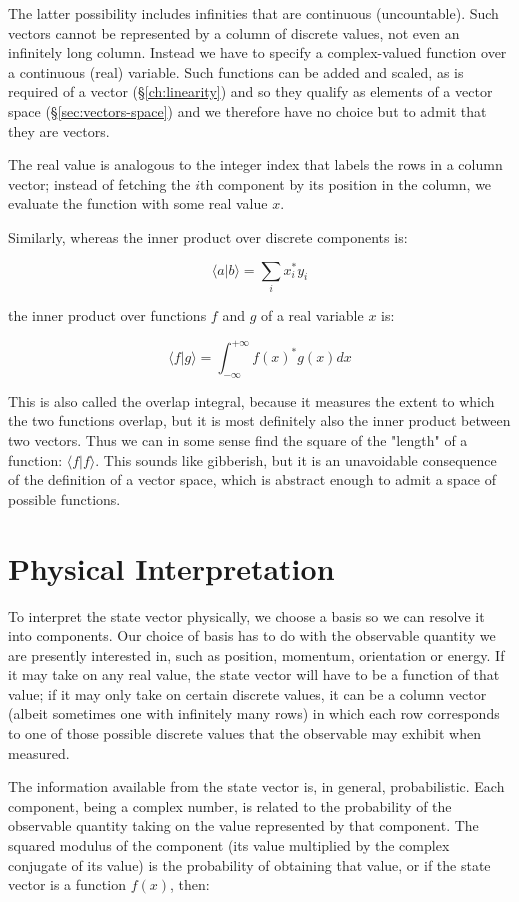 The latter possibility includes infinities that are continuous (uncountable). Such vectors cannot be represented by a column of discrete values, not even an infinitely long column. Instead we have to specify a complex-valued function over a continuous (real) variable. Such functions can be added and scaled, as is required of a vector (§\ref{ch:linearity}) and so they qualify as elements of a vector space (§\ref{sec:vectors-space}) and we therefore have no choice but to admit that they are vectors.

The real value is analogous to the integer index that labels the rows in a column vector; instead of fetching the $i$th component by its position in the column, we evaluate the function with some real value $x$.

Similarly, whereas the inner product over discrete components is:

$$
\langle a | b \rangle
=
\sum_i
x_i^* y_i
$$

the inner product over functions $f$ and $g$ of a real variable $x$ is:

$$
\langle f | g \rangle
=
\int_{-\infty}^{+\infty}
f(x)^* g(x)
dx
$$

This is also called the overlap integral, because it measures the extent to which the two functions overlap, but it is most definitely also the inner product between two vectors. Thus we can in some sense find the square of the "length" of a function: $\langle f | f \rangle$. This sounds like gibberish, but it is an unavoidable consequence of the definition of a vector space, which is abstract enough to admit a space of possible functions.

\section{Physical Interpretation}

To interpret the state vector physically, we choose a basis so we can resolve it into components. Our choice of basis has to do with the observable quantity we are presently interested in, such as position, momentum, orientation or energy. If it may take on any real value, the state vector will have to be a function of that value; if it may only take on certain discrete values, it can be a column vector (albeit sometimes one with infinitely many rows) in which each row corresponds to one of those possible discrete values that the observable may exhibit when measured.

The information available from the state vector is, in general, probabilistic. Each component, being a complex number, is related to the probability of the observable quantity taking on the value represented by that component. The squared modulus of the component (its value multiplied by the complex conjugate of its value) is the probability of obtaining that value, or if the state vector is a function $f(x)$, then:

